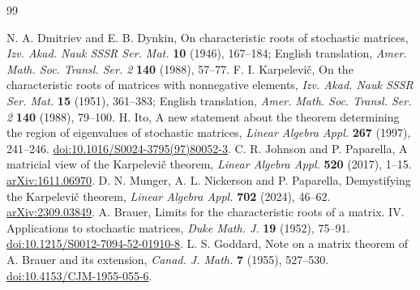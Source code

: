 \documentclass[11pt,a4paper]{article}
\theoremstyle{definition}
\theoremstyle{remark}
\numberwithin{equation}{section}
\begin{document}
\begin{thebibliography}{99}
\raggedright
{} N. A. Dmitriev and E. B. Dynkin,
On characteristic roots of stochastic matrices,
\emph{Izv. Akad. Nauk SSSR Ser. Mat.} \textbf{10} (1946), 167--184;
English translation, \emph{Amer. Math. Soc. Transl. Ser. 2} \textbf{140} (1988), 57--77.
 F. I. Karpelevi\v{c},
On the characteristic roots of matrices with nonnegative elements,
\emph{Izv. Akad. Nauk SSSR Ser. Mat.} \textbf{15} (1951), 361--383;
English translation, \emph{Amer. Math. Soc. Transl. Ser. 2} \textbf{140} (1988), 79--100.
 H. Ito,
A new statement about the theorem determining the region of eigenvalues of stochastic matrices,
\emph{Linear Algebra Appl.} \textbf{267} (1997), 241--246.
\href{https://doi.org/10.1016/S0024-3795(97)80052-3}{doi:10.1016/S0024-3795(97)80052-3}.
 C. R. Johnson and P. Paparella,
A matricial view of the Karpelevi\v{c} theorem,
\emph{Linear Algebra Appl.} \textbf{520} (2017), 1--15.
\href{https://arxiv.org/abs/1611.06970}{arXiv:1611.06970}.
 D. N. Munger, A. L. Nickerson and P. Paparella,
Demystifying the Karpelevi\v{c} theorem,
\emph{Linear Algebra Appl.} \textbf{702} (2024), 46--62.
\href{https://arxiv.org/abs/2309.03849}{arXiv:2309.03849}.
 A. Brauer,
Limits for the characteristic roots of a matrix. IV. Applications to stochastic matrices,
\emph{Duke Math. J.} \textbf{19} (1952), 75--91.
\href{https://doi.org/10.1215/S0012-7094-52-01910-8}{doi:10.1215/S0012-7094-52-01910-8}.
 L. S. Goddard,
Note on a matrix theorem of A. Brauer and its extension,
\emph{Canad. J. Math.} \textbf{7} (1955), 527--530.
\href{https://doi.org/10.4153/CJM-1955-055-6}{doi:10.4153/CJM-1955-055-6}.


\end{thebibliography}
\end{document}

